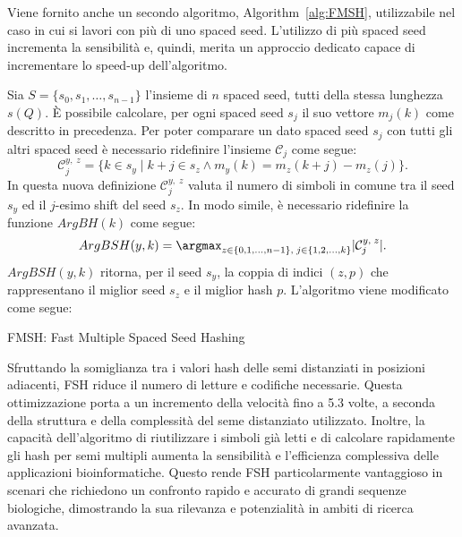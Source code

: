 Viene fornito anche un secondo algoritmo, Algorithm~\ref{alg:FMSH}, utilizzabile nel caso in cui si lavori con più di uno spaced seed. L'utilizzo di più spaced seed incrementa la sensibilità \cite{leimeister2014fast} e, quindi, merita un approccio dedicato capace di incrementare lo speed-up dell'algoritmo.

Sia $S = \{ s_0, s_1, \dots, s_{n - 1} \}$ l'insieme di $n$ spaced seed, tutti della stessa lunghezza $s(Q)$. È possibile calcolare, per ogni spaced seed $s_j$ il suo vettore $m_j(k)$ come descritto in precedenza. Per poter comparare un dato spaced seed $s_j$ con tutti gli altri spaced seed è necessario ridefinire l'insieme $\mathcal{C}_j$ come segue: \[ \mathcal{C}_j^{y,\; z} = \{ k \in s_y \; | \; k + j \in s_z \wedge m_y(k) = m_z(k + j) - m_z(j) \}. \] In questa nuova definizione $\mathcal{C}_j^{y,\; z}$ valuta il numero di simboli in comune tra il seed $s_y$ ed il $j$-esimo shift del seed $s_z$. In modo simile, è necessario ridefinire la funzione $ArgBH(k)$ come segue: \[ ArgBSH(y, k) = \argmax_{z \in \{ 0, 1, \dots, n - 1 \},\; j \in \{ 1, 2, \dots, k \}} |\mathcal{C}_j^{y,\; z}|. \] $ArgBSH(y, k)$ ritorna, per il seed $s_y$, la coppia di indici $(z, p)$ che rappresentano il miglior seed $s_z$ e il miglior hash $p$. L'algoritmo viene modificato come segue:

\begin{algorithm}[H]
	\caption{FMSH: Fast Multiple Spaced Seed Hashing}
	\label{alg:FMSH}
\end{algorithm}

Sfruttando la somiglianza tra i valori hash delle semi distanziati in posizioni adiacenti, \acs{FSH} riduce il numero di letture e codifiche necessarie. Questa ottimizzazione porta a un incremento della velocità fino a 5.3 volte, a seconda della struttura e della complessità del seme distanziato utilizzato. Inoltre, la capacità dell'algoritmo di riutilizzare i simboli già letti e di calcolare rapidamente gli hash per semi multipli aumenta la sensibilità e l'efficienza complessiva delle applicazioni bioinformatiche. Questo rende \acs{FSH} particolarmente vantaggioso in scenari che richiedono un confronto rapido e accurato di grandi sequenze biologiche, dimostrando la sua rilevanza e potenzialità in ambiti di ricerca avanzata.
